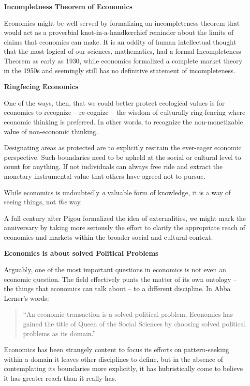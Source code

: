 \documentclass[
]{book}
\begin{document}
\textbf{Incompletness Theorem of Economics}

Economics might be well served by formalizing an incompleteness theorem that would act as
a proverbial knot-in-a-handkerchief reminder about the limits of claims that economics can
make. It is an oddity of human intellectual thought that the most logical of our sciences,
mathematics, had a formal Incompleteness Theorem as early as 1930, while economics
formalized a complete market theory in the 1950s and seemingly still has no definitive
statement of incompleteness.

\textbf{Ringfecing Economics}

One of the ways, then, that we could better protect ecological values is for economics to
recognize -- re-cognize -- the wisdom of culturally ring-fencing where economic thinking is
preferred. In other words, to recognize the non-monetizable value of non-economic thinking.

Designating areas as protected are to explicitly restrain the ever-eager economic perspective.
Such boundaries need to be upheld at the social or cultural level to count for anything.
If not individuals can always free ride and extract the monetary instrumental value
that others have agreed not to pursue.

While economics is undoubtedly \emph{a} valuable form of knowledge, it is a way of seeing things,
not \emph{the} way.

A full century after Pigou formalized the idea of externalities, we might mark the
anniversary by taking more seriously the effort to clarify the appropriate reach of economics
and markets within the broader social and cultural context.

\textbf{Economics is about solved Political Problems}

Arguably, one of the most important questions in economics is not even an economic
question.
The field effectively punts the matter of its own ontology -- the things that economics
can talk about -- to a different discipline. In Abba Lerner's words:

\begin{quote}
``An economic transaction is a solved political problem. Economics has
gained the title of Queen of the Social Sciences by choosing solved political
problems as its domain.''
\end{quote}

Economics has been strangely content to focus its efforts on pattern-seeking within a domain
it leaves other disciplines to define, but in the absence of contemplating its boundaries more
explicitly, it has hubristically come to believe it has greater reach than it really has.
\end{document}

